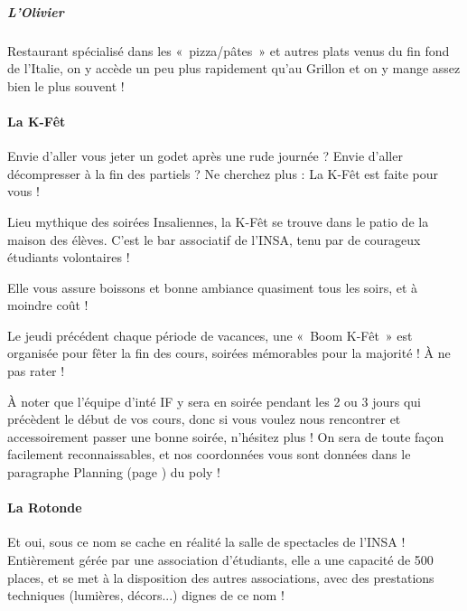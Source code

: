  \vspace{1em}
 
\subparagraph{L'Olivier}
Restaurant  spécialisé dans les «~pizza/pâtes~» et autres plats venus du fin
fond de l'Italie, on y accède un peu plus rapidement qu'au Grillon et on y
mange assez bien le plus souvent !

\paragraph{La K-Fêt}
Envie d'aller vous jeter un godet après une rude journée ? Envie d'aller
décompresser à la fin des partiels ? Ne cherchez plus : La K-Fêt est faite
pour vous !

\vspace{1em}

Lieu mythique des soirées Insaliennes, la K-Fêt se trouve dans le patio de
la maison des élèves. C'est le bar associatif de l'INSA, tenu par de courageux
étudiants volontaires !

\vspace{1em}

Elle vous assure boissons et bonne ambiance quasiment tous les soirs, et à
moindre coût !

\vspace{1em}

Le jeudi précédent chaque période de vacances, une «~Boom K-Fêt~» est organisée
pour fêter la fin des cours, soirées mémorables pour la majorité ! À ne
pas rater !

\vspace{1em}

À noter que l'équipe d'inté IF y sera en soirée pendant les 2 ou 3 jours qui
précèdent le début de vos cours, donc si vous voulez nous rencontrer et
accessoirement passer une bonne soirée, n'hésitez plus ! On sera de toute façon
facilement reconnaissables, et nos coordonnées vous sont données dans le
paragraphe Planning (page \pageref{rplanning}) du poly !

\paragraph{La Rotonde}
Et oui, sous ce nom se cache en réalité la salle de spectacles de l'INSA !
Entièrement gérée par une association d'étudiants, elle a une
capacité de 500 places, et se met à la disposition des autres associations, avec
des prestations techniques (lumières, décors...) dignes de ce nom !

\vspace{1em}

